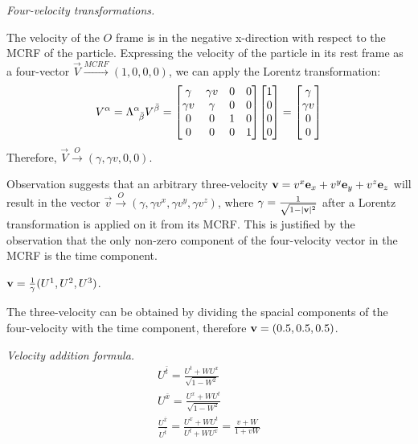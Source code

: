 \documentclass{report}
\begin{document}
\begin{subquests}
	\item \emph{Four-velocity transformations.}
	\begin{subquests}
		\item
		The velocity of the $O$ frame is in the negative x-direction with respect to the MCRF of the particle. Expressing the velocity of the particle in its rest frame as a four-vector ${\vec V} \stackrel{MCRF}{\longrightarrow}(1,0,0,0)$, we can apply the Lorentz transformation:
		\begin{gather*}
			V^{\alpha}=\Lambda^{\alpha}_{\;\;\bar{\beta}}V^{\bar{\beta}} =
			\mqty[
				\gamma & \gamma v & 0 & 0 \\
				\gamma v & \gamma & 0 & 0 \\
				0 & 0 & 1 & 0 \\
				0 & 0 & 0 & 1
			]
			\mqty[
		 		1 \\
				0 \\
				0 \\
				0
			]
			=
			\mqty[
		 		\gamma \\
				\gamma v \\
				0 \\
				0
			]	
		\end{gather*}
		Therefore, ${\vec V} \stackrel{O}{\longrightarrow}(\gamma,\gamma v,0,0)$.
		
		\item
		Observation suggests that an arbitrary three-velocity ${\vb v} =  v^x {\vb e}_x + v^y {\vb e}_y + v^z {\vb e}_z$ will result in the vector ${\vec v} \stackrel{O}{\longrightarrow}(\gamma,\gamma v^{x},\gamma v^{y},\gamma v^{z})$, where $\gamma = \frac{1}{\sqrt{1-|{\vb v}|^2}}$ after a Lorentz transformation is applied on it from its MCRF. This is justified by the observation that the only non-zero component of the four-velocity vector in the MCRF is the time component.

		\item		
		$ \vb v = \frac{1}{\gamma}(U^{1}, U^{2}, U^{3})$.

		\item		
		The three-velocity can be obtained by dividing the spacial components of the four-velocity with the time component, therefore ${\vb v} = (0.5,0.5,0.5)$.
	\end{subquests}

	\item \emph{Velocity addition formula.}
	\begin{gather*}
		U^{\bar t} = \frac{U^{t} + WU^{x}}{\sqrt{1-W^{2}}} \\
		U^{\bar x} = \frac{U^{x} + WU^{t}}{\sqrt{1-W^{2}}} \\
		\frac{U^{\bar x}}{U^{\bar t}} = \frac{U^{x} + WU^{t}}{U^{t} + WU^{x}} = \frac{v + W}{1 + vW}
	\end{gather*}


\end{subquests}
\end{document}
